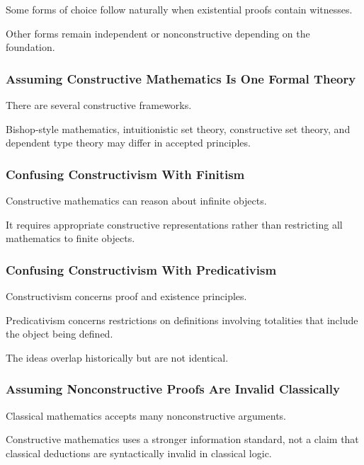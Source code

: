Some forms of choice follow naturally when existential proofs contain
witnesses.

Other forms remain independent or nonconstructive depending on the
foundation.

\subsubsection{Assuming Constructive Mathematics Is One Formal Theory}

There are several constructive frameworks.

Bishop-style mathematics, intuitionistic set theory, constructive set
theory, and dependent type theory may differ in accepted principles.

\subsubsection{Confusing Constructivism With Finitism}

Constructive mathematics can reason about infinite objects.

It requires appropriate constructive representations rather than restricting
all mathematics to finite objects.

\subsubsection{Confusing Constructivism With Predicativism}

Constructivism concerns proof and existence principles.

Predicativism concerns restrictions on definitions involving totalities that
include the object being defined.

The ideas overlap historically but are not identical.

\subsubsection{Assuming Nonconstructive Proofs Are Invalid Classically}

Classical mathematics accepts many nonconstructive arguments.

Constructive mathematics uses a stronger information standard, not a claim
that classical deductions are syntactically invalid in classical logic.

